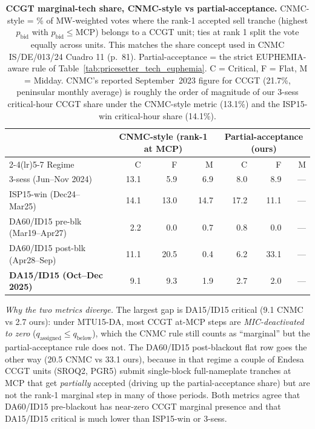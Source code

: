 \documentclass[11pt,a4paper]{article}
\begin{document}
\begin{table}[H]
\centering\scriptsize
\caption{\textbf{CCGT marginal-tech share, CNMC-style vs partial-acceptance.} CNMC-style = \% of MW-weighted votes where the rank-1 accepted sell tranche (highest $p_{\text{bid}}$ with $p_{\text{bid}}\le\text{MCP}$) belongs to a CCGT unit; ties at rank 1 split the vote equally across units. This matches the share concept used in CNMC IS/DE/013/24 Cuadro 11 (p.~81). Partial-acceptance = the strict EUPHEMIA-aware rule of Table~\ref{tab:pricesetter_tech_euphemia}. C = Critical, F = Flat, M = Midday. CNMC's reported September~2023 figure for CCGT (21.7\%, peninsular monthly average) is roughly the order of magnitude of our 3-sess critical-hour CCGT share under the CNMC-style metric (13.1\%) and the ISP15-win critical-hour share (14.1\%).}
\label{tab:cnmc_ccgt_metric}
\setlength{\tabcolsep}{4pt}
\begin{tabular}{l r r r r r r}
\toprule
 & \multicolumn{3}{c}{\textbf{CNMC-style (rank-1 at MCP)}} & \multicolumn{3}{c}{\textbf{Partial-acceptance (ours)}} \\
\cmidrule(lr){2-4}\cmidrule(lr){5-7}
Regime & C & F & M & C & F & M \\
\midrule
3-sess (Jun--Nov 2024)             & 13.1 &  5.9 &  6.9 &  8.0 &  8.9 & --- \\
ISP15-win (Dec24--Mar25)           & 14.1 & 13.0 & 14.7 & 17.2 & 11.1 & --- \\
DA60/ID15 pre-blk (Mar19--Apr27)   &  2.2 &  0.0 &  0.7 &  0.8 &  0.0 & --- \\
DA60/ID15 post-blk (Apr28--Sep)    & 11.1 & 20.5 &  0.4 &  6.2 & 33.1 & --- \\
\textbf{DA15/ID15 (Oct--Dec 2025)} &  9.1 &  9.3 &  1.9 &  2.7 &  2.0 & --- \\
\bottomrule
\end{tabular}
\end{table}

\emph{Why the two metrics diverge.} The largest gap is DA15/ID15 critical (9.1 CNMC vs 2.7 ours): under MTU15-DA, most CCGT at-MCP steps are \emph{MIC-deactivated to zero} ($q_{\text{assigned}}\le q_{\text{below}}$), which the CNMC rule still counts as ``marginal'' but the partial-acceptance rule does not. The DA60/ID15 post-blackout flat row goes the other way (20.5 CNMC vs 33.1 ours), because in that regime a couple of Endesa CCGT units (SROQ2, PGR5) submit single-block full-nameplate tranches at MCP that get \emph{partially} accepted (driving up the partial-acceptance share) but are not the rank-1 marginal step in many of those periods. Both metrics agree that DA60/ID15 pre-blackout has near-zero CCGT marginal presence and that DA15/ID15 critical is much lower than ISP15-win or 3-sess.
\end{document}
